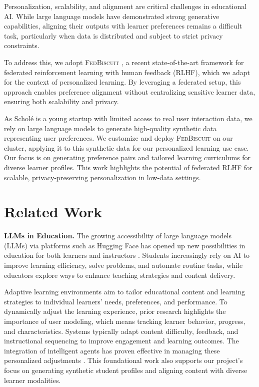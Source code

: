\documentclass[sigconf]{acmart}
\begin{document}
 Personalization, scalability, and alignment are critical challenges in educational AI. While large language models have demonstrated strong generative capabilities, aligning their outputs with learner preferences remains a difficult task, particularly when data is distributed and subject to strict privacy constraints.

To address this, we adopt \textsc{FedBiscuit} \cite{wu2025federatedrlhfaggregatedclient}, a recent state-of-the-art framework for federated reinforcement learning with human feedback (RLHF), which we adapt for the context of personalized learning. By leveraging a federated setup, this approach enables preference alignment without centralizing sensitive learner data, ensuring both scalability and privacy.

As Schol\'e is a young startup with limited access to real user interaction data, we rely on large language models to generate high-quality synthetic data representing user preferences. We customize and deploy \textsc{FedBiscuit} on our cluster, applying it to this synthetic data for our personalized learning use case. Our focus is on generating preference pairs and tailored learning curriculums for diverse learner profiles. This work highlights the potential of federated RLHF for scalable, privacy-preserving personalization in low-data settings.

\section{Related Work}

\textbf{LLMs in Education.} The growing accessibility of large language models (LLMs) via platforms such as Hugging Face has opened up new possibilities in education for both learners and instructors \citep{wang2024large}. Students increasingly rely on AI to improve learning efficiency, solve problems, and automate routine tasks, while educators explore ways to enhance teaching strategies and content delivery.

Adaptive learning environments aim to tailor educational content and learning strategies to individual learners' needs, preferences, and performance. To dynamically adjust the learning experience, prior research highlights the importance of user modeling, which means tracking learner behavior, progress, and characteristics. Systems typically adapt content difficulty, feedback, and instructional sequencing to improve engagement and learning outcomes. The integration of intelligent agents has proven effective in managing these personalized adjustments \citep{shih2008adaptive}. This foundational work also supports our project's focus on generating synthetic student profiles and aligning content with diverse learner modalities.
\end{document}

